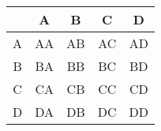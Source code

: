 \begin{table}[htbp]
\centering
\begin{tabular}{|c|c|c|c|c|}
\hline
  & A  & B  & C  & D  \\ \hline
A & AA & AB & AC & AD \\ \hline
B & BA & BB & BC & BD \\ \hline
C & CA & CB & CC & CD \\ \hline
D & DA & DB & DC & DD \\ \hline
\end{tabular}
\end{table}